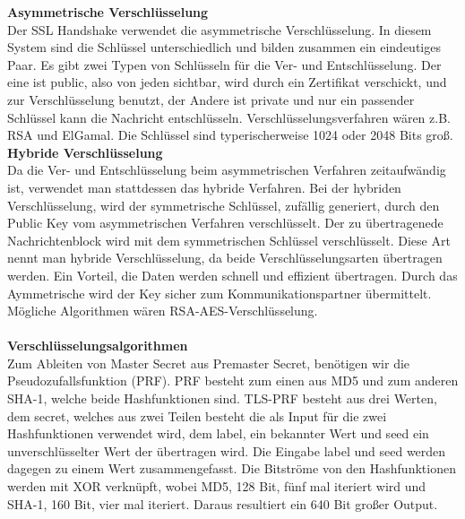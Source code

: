 \documentclass[11pt]{scrartcl}
\begin{document}
\noindent
\textbf{Asymmetrische Verschlüsselung}\\
Der SSL Handshake verwendet die asymmetrische Verschlüsselung. In diesem System sind die Schlüssel unterschiedlich und bilden zusammen ein eindeutiges Paar. Es gibt zwei Typen von Schlüsseln für die Ver- und Entschlüsselung. Der eine ist public, also von jeden sichtbar, wird durch ein Zertifikat verschickt, und zur Verschlüsselung benutzt, der Andere ist private und nur ein passender Schlüssel kann die Nachricht entschlüsseln. Verschlüsselungsverfahren wären z.B. RSA und ElGamal. Die Schlüssel sind typerischerweise 1024 oder 2048 Bits groß. \cite{4}\\



\noindent
\textbf{Hybride Verschlüsselung}\\
Da die Ver- und Entschlüsselung beim asymmetrischen Verfahren zeitaufwändig ist, verwendet man stattdessen das hybride Verfahren. Bei der hybriden Verschlüsselung, wird der symmetrische Schlüssel, zufällig generiert, durch den Public Key vom asymmetrischen Verfahren verschlüsselt. Der zu übertragenede Nachrichtenblock wird mit dem symmetrischen Schlüssel verschlüsselt. Diese Art nennt man hybride Verschlüsselung, da beide Verschlüsselungsarten übertragen werden. Ein Vorteil, die Daten werden schnell und effizient übertragen. Durch das Aymmetrische wird der Key sicher zum Kommunikationspartner übermittelt. Mögliche Algorithmen wären RSA-AES-Verschlüsselung. \cite{3}\\\\


\noindent
\textbf{Verschlüsselungsalgorithmen}\\
Zum Ableiten von Master Secret aus Premaster Secret, benötigen wir die Pseudozufallsfunktion (PRF). PRF besteht zum einen aus MD5 und zum anderen SHA-1, welche beide Hashfunktionen sind. TLS-PRF besteht aus drei Werten, dem secret, welches aus zwei Teilen besteht die als Input für die zwei Hashfunktionen verwendet wird,  dem label, ein bekannter Wert und seed ein unverschlüsselter Wert der übertragen wird. \grqq{}Die Eingabe label und seed werden dagegen zu einem Wert zusammengefasst.\grqq{}\cite{1} Die Bitströme von den Hashfunktionen werden mit XOR verknüpft, wobei MD5, 128 Bit, fünf mal iteriert wird und SHA-1, 160 Bit, vier mal iteriert. Daraus resultiert ein 640 Bit großer Output. \cite{1}
\end{document}
